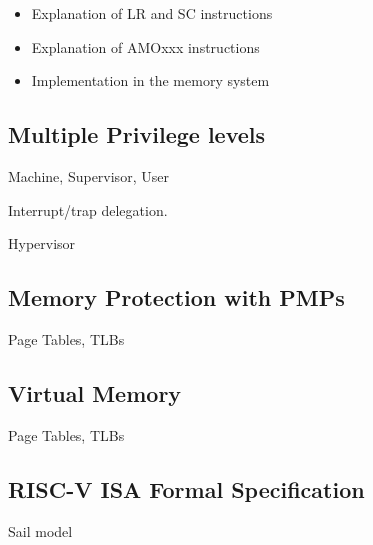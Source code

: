 \begin{itemize}
  \item Explanation of LR and SC instructions
  \item Explanation of AMOxxx instructions
  \item Implementation in the memory system
\end{itemize}


\subsection{Multiple Privilege levels}

Machine, Supervisor, User

Interrupt/trap delegation.

Hypervisor


\subsection{Memory Protection with PMPs}

Page Tables, TLBs


\subsection{Virtual Memory}

Page Tables, TLBs


\subsection{RISC-V ISA Formal Specification}

Sail model

